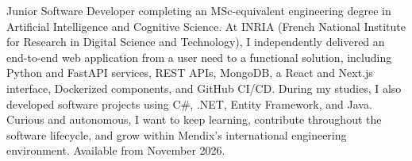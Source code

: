
\begin{cvparagraph}
Junior Software Developer completing an MSc-equivalent engineering degree in Artificial Intelligence and Cognitive Science. At INRIA (French National Institute for Research in Digital Science and Technology), I independently delivered an end-to-end web application from a user need to a functional solution, including Python and FastAPI services, REST APIs, MongoDB, a React and Next.js interface, Dockerized components, and GitHub CI/CD. During my studies, I also developed software projects using C\#, .NET, Entity Framework, and Java. Curious and autonomous, I want to keep learning, contribute throughout the software lifecycle, and grow within Mendix’s international engineering environment. Available from November 2026.
\end{cvparagraph}
